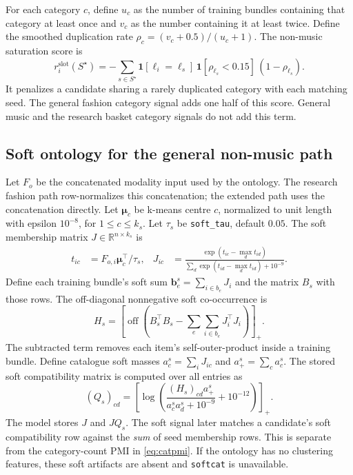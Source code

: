 \documentclass[11pt,a4paper]{article}
\newcommand{\code}[1]{\nolinkurl{#1}}
\newcommand{\R}{\mathbb R}
\newcommand{\off}{\operatorname{off}}
\newcommand{\pos}[1]{\left[#1\right]_+}
\newcommand{\sig}[1]{\mathrm{#1}}
\numberwithin{equation}{section}
\begin{document}
For each category $c$, define $u_c$ as the number of training bundles containing that
category at least once and $v_c$ as the number containing it at least twice. Define the
smoothed duplication rate $\rho_c=(v_c+0.5)/(u_c+1)$. The non-music saturation score is
\begin{equation}\label{eq:saturation}
 r^{\sig{slot}}_i(S^\star)=
 -\sum_{s\in S^\star}\mathbf1[\ell_i=\ell_s]\,
 \mathbf1[\rho_{\ell_s}<0.15]\,(1-\rho_{\ell_s}).
\end{equation}
It penalizes a candidate sharing a rarely duplicated category with each matching seed.
The general fashion category signal adds one half of this score. General music and the
research basket category signals do not add this term.

\subsection{Soft ontology for the general non-music path}
Let $F_o$ be the concatenated modality input used by the ontology. The research fashion
path row-normalizes this concatenation; the extended path uses the concatenation directly.
Let $\bm\mu_c$ be k-means centre $c$, normalized to unit length with epsilon $10^{-8}$,
for $1\le c\le k_s$. Let $\tau_s$ be \code{soft_tau}, default $0.05$.
The soft membership matrix $J\in\R^{n\times k_s}$ is
\begin{align}
 t_{ic}&=F_{o,i}\bm\mu_c^\top/\tau_s,
 &J_{ic}&=\frac{\exp(t_{ic}-\max_d t_{id})}
 {\sum_d\exp(t_{id}-\max_d t_{id})+10^{-9}}.
\end{align}
Define each training bundle's soft sum $\bm b_e^s=\sum_{i\in b_e}J_i$ and the matrix
$B_s$ with those rows. The off-diagonal nonnegative soft co-occurrence is
\begin{equation}
 H_s=\left[\off\left(B_s^\top B_s-
             \sum_e\sum_{i\in b_e}J_i^\top J_i\right)\right]_+.
\end{equation}
The subtracted term removes each item's self-outer-product inside a training bundle.
Define catalogue soft masses $a^s_c=\sum_i J_{ic}$ and $a^s_+=\sum_c a^s_c$. The
stored soft compatibility matrix is computed over all entries as
\begin{equation}
 (Q_s)_{cd}=\pos{\log\left(
 \frac{(H_s)_{cd}a^s_+}{a^s_c a^s_d+10^{-9}}+10^{-12}\right)}.
\end{equation}
The model stores $J$ and $JQ_s$. The soft signal later matches a candidate's soft
compatibility row against the \emph{sum} of seed membership rows. This is separate from
the category-count PMI in \eqref{eq:catpmi}. If the ontology has no clustering features,
these soft artifacts are absent and \code{softcat} is unavailable.
\end{document}
